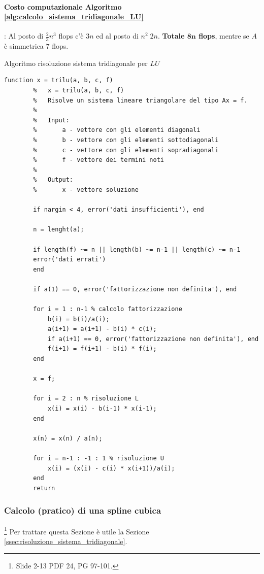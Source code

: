 \paragraph{Costo computazionale Algoritmo \ref{alg:calcolo_sistema_tridiagonale_LU}}: Al posto di $\frac{2}{3}n^3$ flops c'è $3n$ ed al posto di $n^2\; 2n$. \textbf{Totale $\boldsymbol{8n}$ flops}, mentre se $A$ è simmetrica $7$ flops.

\begin{algorithm}\caption{Algoritmo risoluzione sistema tridiagonale per $LU$}
	\label{alg:calcolo_sistema_tridiagonale_LU}
	\begin{lstlisting}[style=Matlab-editor]
		function x = trilu(a, b, c, f)
		%	x = trilu(a, b, c, f)
		%	Risolve un sistema lineare triangolare del tipo Ax = f.
		%
		%	Input:
		%		a - vettore con gli elementi diagonali
		%		b - vettore con gli elementi sottodiagonali
		%		c - vettore con gli elementi sopradiagonali
		%		f - vettore dei termini noti
		%
		%	Output:
		%		x - vettore soluzione
		
		if nargin < 4, error('dati insufficienti'), end
		
		n = lenght(a);
		
		if length(f) ~= n || length(b) ~= n-1 || length(c) ~= n-1
		error('dati errati')
		end
		
		if a(1) == 0, error('fattorizzazione non definita'), end
		
		for i = 1 : n-1 % calcolo fattorizzazione
			b(i) = b(i)/a(i);
			a(i+1) = a(i+1) - b(i) * c(i);
			if a(i+1) == 0, error('fattorizzazione non definita'), end
			f(i+1) = f(i+1) - b(i) * f(i);
		end
		
		x = f;
		
		for i = 2 : n % risoluzione L
			x(i) = x(i) - b(i-1) * x(i-1);
		end
		
		x(n) = x(n) / a(n);
		
		for i = n-1 : -1 : 1 % risoluzione U
			x(i) = (x(i) - c(i) * x(i+1))/a(i);
		end
		return
	\end{lstlisting}
\end{algorithm}

\subsubsection{Calcolo (pratico) di una spline cubica}\label{ssec:calcolo_spline_cubiche}\footnote{Slide 2-13 PDF 24, PG 97-101.}
Per trattare questa Sezione è utile la Sezione \ref{ssec:risoluzione_sistema_tridiagonale}.

